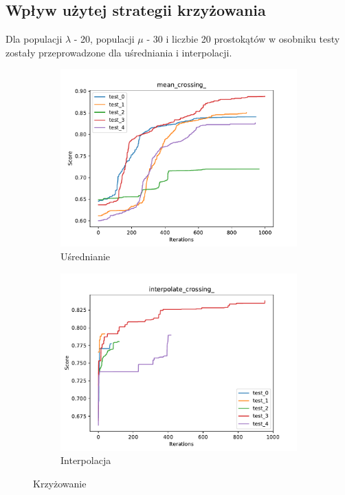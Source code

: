 \subsection*{Wpływ użytej strategii krzyżowania}
Dla populacji $\lambda$ - 20, populacji $\mu$ - 30 i liczbie 20 prostokątów w osobniku testy zostały przeprowadzone dla uśredniania i interpolacji.

\begin{figure}[h!]
    \centering 
    \begin{subfigure}[b]{0.49\linewidth}
        \includegraphics[width=\linewidth]{img/mean_crossing_.pdf}
        \caption{Uśrednianie}
    \end{subfigure}
    \begin{subfigure}[b]{0.49\linewidth}
        \includegraphics[width=\linewidth]{img/interpolate_crossing_.pdf}
        \caption{Interpolacja}
    \end{subfigure}
    \caption{Krzyżowanie}
    \label{fig:crossing}
\end{figure}

